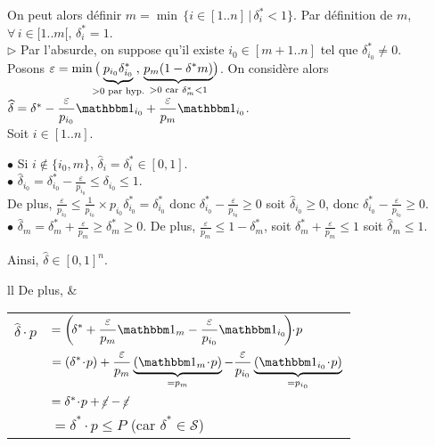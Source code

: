 \documentclass{article}
\renewcommand{\cal}[1]{\mathcal{#1}}
\newcommand{\dotp}{\! \cdot \!}
\newcommand{\1}{\bbm{1}}
\begin{document}
			On peut alors définir \( m = \min \, \{ i \in [1..n] \, | \, \delta^*_i < 1 \} \).
			Par définition de $m$, \( \forall \, i \in [1..m[, \, \delta^*_i = 1 \).
				\\[3mm]
			$\triangleright$ Par l'absurde, on suppose qu'il existe \( i_0 \in [m+1..n] \) tel que \( \delta^*_{i_0} \neq 0 \). \\
			Posons \( \varepsilon = \min \big( \!\!\!\!\! \underbrace{p_{i_0} \delta^*_{i_0}}_{> 0 \text{ par hyp.}} \!\!\!\! , \, \underbrace{p_m (1 - \delta^*m)}_{> 0 \text{ car } \delta^*_m < 1} \hspace{-0.6mm} \big) \).
			On considère alors \( \widehat{\delta} = \delta^* - \displaystyle \frac{\varepsilon}{p_{i_0}} \1_{i_0} + \frac{\varepsilon}{p_m} \1_{i_0}\).
				\\
			Soit $i \in [1..n]$. \\
			\hspace*{5mm} \parbox{170mm}{
				$\bullet$ Si \( i \notin \{ i_0, m \} \), \( \widehat{\delta}_i = \delta^*_i \in [0, 1] \). \\[1mm]
				$\bullet$ \( \displaystyle \widehat{\delta}_{i_0} = \delta^*_{i_0} - \frac{\varepsilon}{p_{i_0}} \leq \delta_{i_0} \leq 1 \). \\[-1mm]
				De plus, \( \displaystyle \frac{\varepsilon}{p_{i_0}} \leq \frac{1}{p_{i_0}} \times p_{i_0} \delta^*_{i_0} = \delta^*_{i_0}\) donc \( \displaystyle \delta^*_{i_0} - \frac{\varepsilon}{p_{i_0}} \geq 0 \) soit \( \widehat{\delta}_{i_0} \geq 0 \), donc \( \displaystyle \delta^*_{i_0} - \frac{\varepsilon}{p_{i_0}} \geq 0 \). \\[1mm]
				$\bullet$ \(\displaystyle \widehat{\delta}_m = \delta^*_m + \frac{\varepsilon}{p_m} \geq \delta^*_m \geq 0 \). %
				De plus, \( \displaystyle \frac{\varepsilon}{p_m} \leq 1 - \delta^*_m \), soit \( \displaystyle \delta^*_m + \frac{\varepsilon}{p_m} \leq 1 \) soit \( \widehat{\delta}_m \leq 1 \).
			}
			Ainsi, \( \widehat{\delta} \in [0, 1]^n \).
				\\[2.5mm]
			\hspace*{-3.5mm}
				\begin{tabular}[t]{ll}
					De plus, \hspace{-4mm} &
					\begin{tabular}[t]{ll}
						\( \widehat{\delta} \dotp p \) \hspace{-4mm}
						& \( = \displaystyle \left( \! \delta^* + \frac{\varepsilon}{p_m} \1_m - \frac{\varepsilon}{p_{i_0}} \1_{i_0} \! \right) \! \dotp p \) \\
						& \( = \displaystyle (\delta^* \dotp p ) + \frac{\varepsilon}{p_m} \underbrace{(\1_m \dotp p)}_{= p_m} - \frac{\varepsilon}{p_{i_0}} \underbrace{(\1_{i_0} \dotp p)}_{= p_{i_0}} \) \\[-2.5mm]
						& \( = \delta^* \dotp p + \cancel{\varepsilon} - \cancel{\varepsilon} \) \\
						& \( = \delta^* \dotp p \leq P \) \quad (car $\delta^* \in \cal{S}$)
					\end{tabular}
				\end{tabular} \\
\end{document}

